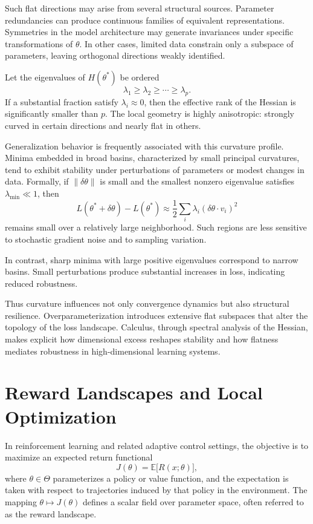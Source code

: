 \documentclass[12pt]{book}
\begin{document}
Such flat directions may arise from several structural sources. Parameter redundancies can produce continuous families of equivalent representations. Symmetries in the model architecture may generate invariances under specific transformations of $\theta$. In other cases, limited data constrain only a subspace of parameters, leaving orthogonal directions weakly identified.

Let the eigenvalues of $H(\theta^\ast)$ be ordered
\[
\lambda_1 \ge \lambda_2 \ge \cdots \ge \lambda_p.
\]
If a substantial fraction satisfy $\lambda_i \approx 0$, then the effective rank of the Hessian is significantly smaller than $p$. The local geometry is highly anisotropic: strongly curved in certain directions and nearly flat in others.

Generalization behavior is frequently associated with this curvature profile. Minima embedded in broad basins, characterized by small principal curvatures, tend to exhibit stability under perturbations of parameters or modest changes in data. Formally, if $\|\delta \theta\|$ is small and the smallest nonzero eigenvalue satisfies $\lambda_{\min} \ll 1$, then
\[
L(\theta^\ast + \delta \theta)
-
L(\theta^\ast)
\approx
\frac{1}{2}
\sum_i \lambda_i (\delta \theta \cdot v_i)^2
\]
remains small over a relatively large neighborhood. Such regions are less sensitive to stochastic gradient noise and to sampling variation.

In contrast, sharp minima with large positive eigenvalues correspond to narrow basins. Small perturbations produce substantial increases in loss, indicating reduced robustness.

Thus curvature influences not only convergence dynamics but also structural resilience. Overparameterization introduces extensive flat subspaces that alter the topology of the loss landscape. Calculus, through spectral analysis of the Hessian, makes explicit how dimensional excess reshapes stability and how flatness mediates robustness in high-dimensional learning systems.

\section{Reward Landscapes and Local Optimization}

In reinforcement learning and related adaptive control settings, the objective is to maximize an expected return functional
\[
J(\theta)
=
\mathbb{E}\big[ R(x;\theta) \big],
\]
where $\theta \in \Theta$ parameterizes a policy or value function, and the expectation is taken with respect to trajectories induced by that policy in the environment. The mapping $\theta \mapsto J(\theta)$ defines a scalar field over parameter space, often referred to as the reward landscape.
\end{document}
